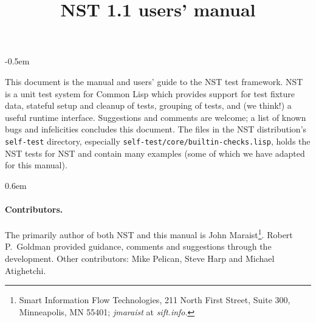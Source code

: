 \documentclass{article}
\title{NST 1.1 users' manual}
\begin{document}
\maketitle
\thispagestyle{empty}
\parskip -0.5em

\noindent This document is the manual and users' guide to the NST test
framework.  NST is a unit test system for Common Lisp which provides
support for test fixture data, stateful setup and cleanup of tests,
grouping of tests, and (we think!) a useful runtime interface.
Suggestions and comments are welcome; a list of known bugs and
infelicities concludes this document.  The files in the NST
distribution's \texttt{self-test} directory, especially
\texttt{self-test/core/builtin-checks.lisp}, holds the NST tests for
NST and contain many examples (some of which we have adapted for this
manual).

\tableofcontents
\parskip 0.6em
\parindent 0pt

\paragraph{Contributors.}
The primarily author of both NST and this manual is John
Maraist\footnote{Smart Information Flow Technologies, 211 North First
  Street, Suite 300, Minneapolis, MN 55401; \textsl{jmaraist} at
  \textsl{sift.info}.}.  Robert P.\ Goldman provided guidance,
comments and suggestions through the development.  Other contributors:
Mike Pelican, Steve Harp and Michael Atighetchi.
\cleardoublepage
{}







\appendix
{}


\printindex
\end{document}
